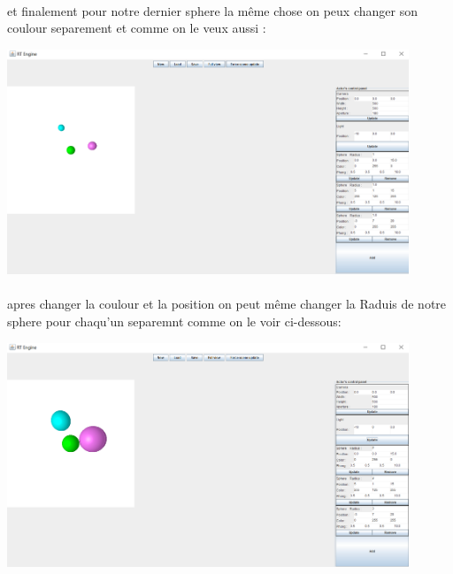 \documentclass[12pt]{article}
\begin{document}
		\paragraph{}
            et finalement pour notre dernier sphere la même chose on peux changer son coulour separement et comme on le veux aussi :
		        \begin{center}
	    	    \includegraphics[width=0.9\textwidth]{./images/thirdsphere.png}
			    \end{center}
			
		\paragraph{}
            apres changer la coulour et la position on peut même changer la Raduis de notre sphere pour chaqu'un separemnt comme on le voir ci-dessous:
		        \begin{center}
	    	    \includegraphics[width=0.9\textwidth]{./images/raduissphere.png}
	    	    \end{center}
        \newpage
\end{document}
